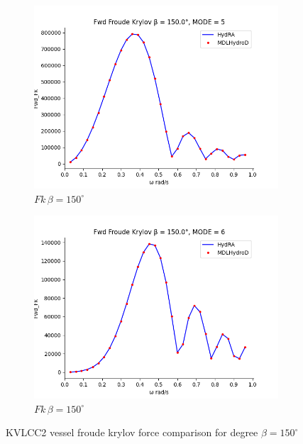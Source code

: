 \begin{figure}[H]
\begin{subfigure}[b]{0.45\textwidth}
        \includegraphics[width=\textwidth]{plots/kvlcc/fk/fk5.png}
        \caption{$Fk \, \beta = 150^{\circ}$}
    \end{subfigure}
    \begin{subfigure}[b]{0.45\textwidth}
        \includegraphics[width=\textwidth]{plots/kvlcc/fk/fk6.png}
        \caption{$Fk \, \beta = 150^{\circ}$}
    \end{subfigure}
    \caption{KVLCC2 vessel froude krylov force comparison for degree $\beta= 150^{\circ}$}
    \label{fig:kvlcc_froude_krylov}
\end{figure}

